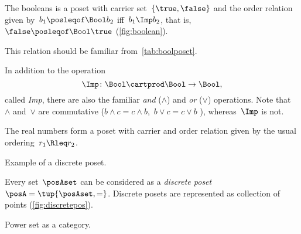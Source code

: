 \begin{example}[Booleans]
    \label{ex:bool}
    The booleans \index{\Bool} is a poset with carrier set~$\{\true,\false\}$ and the order relation given by~$b_1 \posleqof\Bool b_2$ iff~$b_1 \Imp b_2$, that is,~$\false \posleqof\Bool \true$ (\cref{fig:boolean}).

    This relation should be familiar from~\cref{tab:boolposet}.

    In addition to the operation
    \begin{equation*}
        \Imp\colon\Bool\cartprod \Bool\to\Bool,
    \end{equation*}
    called \emph{Imp}, there are also the familiar \emph{and} ($\wedge$) and \emph{or} ($\vee$) operations.
    Note that~$\wedge$ and~$\vee$ are commutative ($b\wedge c = c\wedge b$,~$b\vee c = c\vee b$ ), whereas~$\Imp$ is not.
\end{example}

\begin{example}[Reals]
    The real numbers \reals form a poset with carrier \reals and order relation given by the usual ordering~$r_1 \Rleq r_2$.
\end{example}

\begin{marginfigure}
    \centering
    \caption{Example of a discrete poset.}
    \label{fig:discretepos}
\end{marginfigure}

\begin{example}
    \label{ex:discreteposet}
    Every set~$\posAset$ can be considered as a \emph{discrete poset}~$\posA = \tup{\posAset,=}$.
    Discrete posets are represented as collection of points (\cref{fig:discretepos}).
\end{example}

\begin{marginfigure}
    \centering
    \caption{Power set as a category.}
    \label{fig:powersetcat}
\end{marginfigure}
\newcommand{\fitinmargin}[1]{%
    \maxsizebox{\marginparwidth}{!}{#1}%
}

\newcommand{\fitinline}[1]{%
    \maxsizebox{\textwidth}{!}{#1}%
}

\begin{marginfigure}
    \centering

    \caption{}
\end{marginfigure}

